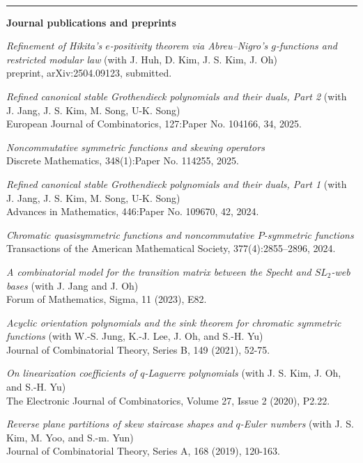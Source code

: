 \documentclass[letterpaper,11pt]{article}
\newcommand{\resheading}[1]{
	\vspace{5pt}
	\textbf{\sffamily{\mbox{~}\makebox[6.762in][l]{\large #1} \vphantom{p\^{E}}}} \\[-6pt]
	\par\noindent\rule{\textwidth}{0.4pt}
}
\begin{document}
\vspace{1cm}
\resheading{Publications}
{\bf Journal publications and preprints}
\begin{etaremune}
    \item \emph{Refinement of Hikita's $e$-positivity theorem via Abreu--Nigro's $g$-functions and restricted modular law} (with J. Huh, D. Kim, J. S. Kim, J. Oh) \\
  preprint, arXiv:2504.09123, submitted.

    \item \emph{Refined canonical stable Grothendieck polynomials and their duals, Part 2} (with J. Jang, J. S. Kim, M. Song, U-K. Song) \\
    European Journal of Combinatorics, 127:Paper No. 104166, 34, 2025.

    \item \emph{Noncommutative symmetric functions and skewing operators} \\
    Discrete Mathematics, 348(1):Paper No. 114255, 2025.

    \item \emph{Refined canonical stable Grothendieck polynomials and their duals, Part 1} (with J. Jang, J. S. Kim, M. Song, U-K. Song) \\
    Advances in Mathematics, 446:Paper No. 109670, 42, 2024.
    
    \item \emph{Chromatic quasisymmetric functions and noncommutative $P$-symmetric functions} \\
    Transactions of the American Mathematical Society, 377(4):2855–2896, 2024.

    \item \emph{A combinatorial model for the transition matrix between the Specht and $SL_2$-web bases} (with J. Jang and J. Oh) \\
    Forum of Mathematics, Sigma, 11 (2023), E82.
    
    \item \emph{Acyclic orientation polynomials and the sink theorem for chromatic symmetric functions} (with W.-S. Jung, K.-J. Lee, J. Oh, and S.-H. Yu) \\
    Journal of Combinatorial Theory, Series B, 149 (2021), 52-75.

    \item \emph{On linearization coefficients of $q$-Laguerre polynomials} (with J. S. Kim, J. Oh, and S.-H. Yu) \\
    The Electronic Journal of Combinatorics, Volume 27, Issue 2 (2020), P2.22.

    \item \emph{Reverse plane partitions of skew staircase shapes and $q$-Euler numbers} (with J. S. Kim, M. Yoo, and S.-m. Yun) \\
    Journal of Combinatorial Theory, Series A, 168 (2019), 120-163.
\end{etaremune}
	
\end{document}
